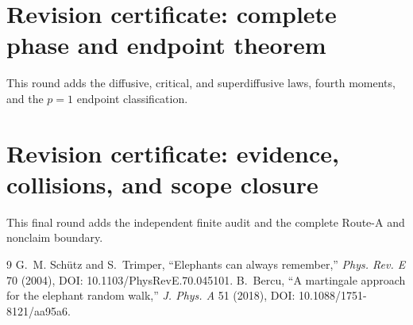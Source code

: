 \documentclass[9pt]{extarticle}
\begin{document}
\section*{Revision certificate: complete phase and endpoint theorem}
This round adds the diffusive, critical, and superdiffusive laws, fourth
moments, and the $p=1$ endpoint classification.
\else
\section*{Revision certificate: evidence, collisions, and scope closure}
This final round adds the independent finite audit and the complete
Route-A and nonclaim boundary.
\fi

\begin{thebibliography}{9}
 G.~M. Sch\"utz and S.~Trimper,
``Elephants can always remember,'' \emph{Phys. Rev. E} 70 (2004),
DOI: 10.1103/PhysRevE.70.045101.
 B.~Bercu, ``A martingale approach for the elephant random
walk,'' \emph{J. Phys. A} 51 (2018), DOI: 10.1088/1751-8121/aa95a6.
\end{thebibliography}
\end{document}
